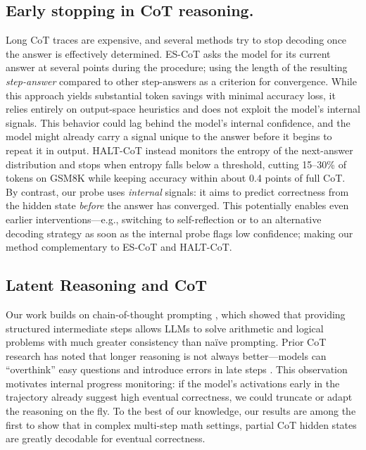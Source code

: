 \documentclass[10pt,a4paper,twocolumn]{article}
\begin{document}
\subsection{Early stopping in CoT reasoning.}

Long CoT traces are expensive, and several methods try to stop decoding once the answer is effectively determined. ES-CoT \cite{mao2025escot} asks the model for its current answer at several points during the procedure; using the length of the resulting \textit{step-answer} compared to other step-answers as a criterion for convergence. While this approach yields substantial token savings with minimal accuracy loss, it relies entirely on output-space heuristics and does not exploit the model's internal signals. This behavior could lag behind the model's internal confidence, and the model might already carry a signal unique to the answer before it begins to repeat it in output. HALT-CoT \cite{laaouach2025haltcot} instead monitors the entropy of the next-answer distribution and stops when entropy falls below a threshold, cutting 15–30\% of tokens on GSM8K while keeping accuracy within about 0.4 points of full CoT. By contrast, our probe uses \emph{internal} signals: it aims to predict correctness from the hidden state \emph{before} the answer has converged. This potentially enables even earlier interventions—e.g., switching to self-reflection or to an alternative decoding strategy as soon as the internal probe flags low confidence; making our method complementary to ES-CoT and HALT-CoT. 

\subsection{Latent Reasoning and CoT}

Our work builds on chain-of-thought prompting \cite{wei2022chain}, which showed that providing structured intermediate steps allows LLMs to solve arithmetic and logical problems with much greater consistency than naïve prompting. Prior CoT research has noted that longer reasoning is not always better—models can “overthink” easy questions and introduce errors in late steps \cite{kojima2022large, zhou2023leastto}. This observation motivates internal progress monitoring: if the model’s activations early in the trajectory already suggest high eventual correctness, we could truncate or adapt the reasoning on the fly. To the best of our knowledge, our results are among the first to show that in complex multi-step math settings, partial CoT hidden states are greatly decodable for eventual correctness.
\end{document}
